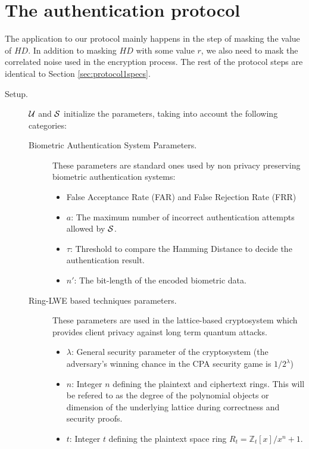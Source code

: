 \section{The authentication protocol}
\label{sec:our_protocol}
The application to our protocol mainly happens in the step of masking the value of $HD$. In addition to masking $HD$ with some value $r$, we also need to mask the correlated noise used in the encryption process. The rest of the protocol steps are identical to Section \ref{sec:protocol1specs}.
\begin{description}
\item[Setup.] $\mathcal{U}$ and $\mathcal{S}$ initialize the parameters, taking into account the following categories:
  \begin{description}
  \item[Biometric Authentication System Parameters.] These parameters are
    standard ones used by non privacy preserving biometric authentication
    systems:
    \begin{itemize}
    \item False Acceptance Rate (FAR) and False Rejection Rate (FRR)
    \item $a$: The maximum number of incorrect authentication attempts allowed
      by $\mathcal{S}$.
    \item $\tau$: Threshold to compare the Hamming Distance to decide the
      authentication result.
    \item \(n'\): The bit-length of the encoded biometric data.
    \end{itemize}
  \item[Ring-LWE based techniques parameters.] These parameters are used in the
    lattice-based cryptosystem which provides client privacy against long term
    quantum attacks.
    \begin{itemize}
    \item $\lambda$: General security parameter of the cryptosystem (the
      adversary's winning chance in the CPA security game is \(1/2^{\lambda}\))
    \item $n$: Integer $n$ defining the plaintext and ciphertext rings. This
      will be refered to as the degree of the polynomial objects or dimension of
      the underlying lattice during correctness and security proofs.
    \item $t$: Integer $t$ defining the plaintext space ring
      $R_t = \mathbb{Z}_t[x]/x^n+1$.

\end{itemize}
\end{description}
\end{description}
